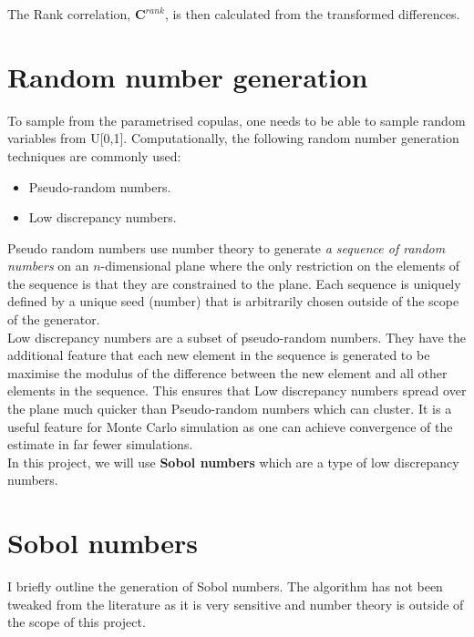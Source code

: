 \documentclass{report}
\theoremstyle{plain}
\theoremstyle{definition}
\begin{document}
The Rank correlation, $\mathbf{C}^{rank}$, is then calculated from the transformed differences.

\section{Random number generation}

To sample from the parametrised copulas, one needs to be able to sample random variables from U[0,1]. Computationally, the following random number generation techniques are commonly used:
\begin{itemize}
	\item Pseudo-random numbers.
	\item Low discrepancy numbers.
\end{itemize}

Pseudo random numbers use number theory to generate \emph{a sequence of random numbers} on an $n$-dimensional plane where the only restriction on the elements of the sequence is that they are constrained to the plane. Each sequence is uniquely defined by a unique seed (number) that is arbitrarily chosen outside of the scope of the generator.\\

Low discrepancy numbers are a subset of pseudo-random numbers. They have the additional feature that each new element in the sequence is generated to be maximise the modulus of the difference between the new element and all other elements in the sequence. This ensures that Low discrepancy numbers spread over the plane much quicker than Pseudo-random numbers which can cluster. It is a useful feature for Monte Carlo simulation as one can achieve convergence of the estimate in far fewer simulations.\\


In this project, we will use \textbf{Sobol numbers} which are a type of low discrepancy numbers.

\section{Sobol numbers}

I briefly outline the generation of Sobol numbers. The algorithm has not been tweaked from the literature as it is very sensitive and number theory is outside of the scope of this project.\\
\end{document}
